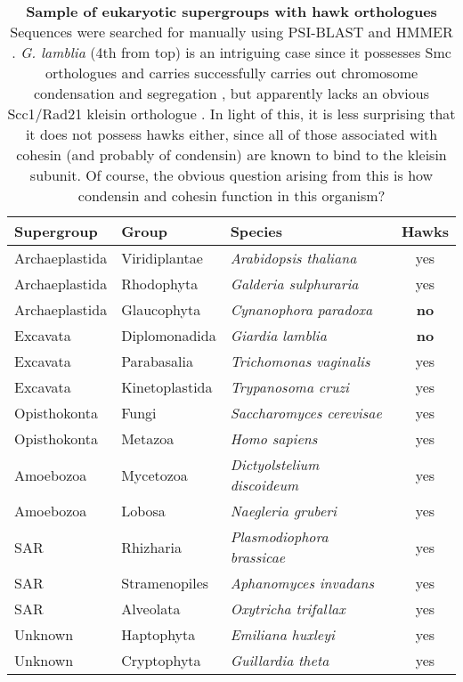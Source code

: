 \documentclass[a4paper,11pt,twoside,openright]{scrbook}
\begin{document}
\begin{table}[h]
    \captionsetup{width=0.85\linewidth}
    \caption[Sample of eukaryotic supergroups with hawk orthologues]{\sffamily \textbf{Sample of eukaryotic supergroups with hawk orthologues} \\ \small Sequences were searched for manually using PSI-BLAST and HMMER \cite{Altschul1997,Finn2011}. \textit{G. lamblia} (4th from top) is an intriguing case since it possesses Smc orthologues and carries successfully carries out chromosome condensation and segregation \cite{Tumova2015}, but apparently lacks an obvious Scc1/Rad21 kleisin orthologue \cite{Eme2011,Tumova2015}. In light of this, it is less surprising that it does not possess hawks either, since all of those associated with cohesin (and probably of condensin) are known to bind to the kleisin subunit. Of course, the obvious question arising from this is how condensin and cohesin function in this organism?}
    \centering
    \onehalfspacing
    \begin{tabular}{l l l c}
    \hline
    Supergroup  & Group   &  Species &   Hawks\\[0.1cm]
    \hline
Archaeplastida &   Viridiplantae  &   \textit{Arabidopsis thaliana}     &  yes\\
Archaeplastida &   Rhodophyta     &   \textit{Galderia sulphuraria}     &  yes\\
Archaeplastida &   Glaucophyta    &   \textit{Cynanophora paradoxa}     &  \textbf{no}\\
Excavata       &   Diplomonadida  &   \textit{Giardia lamblia}          &  \textbf{no}\\
Excavata       &   Parabasalia    &   \textit{Trichomonas vaginalis}    &  yes\\
Excavata       &   Kinetoplastida &   \textit{Trypanosoma cruzi}        &  yes\\
Opisthokonta   &   Fungi          &   \textit{Saccharomyces cerevisae}  &  yes\\
Opisthokonta   &   Metazoa        &   \textit{Homo sapiens}             &  yes\\
Amoebozoa      &   Mycetozoa      &   \textit{Dictyolstelium discoideum}&  yes\\
Amoebozoa      &   Lobosa         &   \textit{Naegleria gruberi}        &  yes\\
SAR            &   Rhizharia      &   \textit{Plasmodiophora brassicae} &  yes\\
SAR            &   Stramenopiles  &   \textit{Aphanomyces invadans}     &  yes\\
SAR            &   Alveolata      &   \textit{Oxytricha trifallax}      &  yes\\
Unknown        &   Haptophyta     &   \textit{Emiliana huxleyi}         &  yes\\
Unknown        &   Cryptophyta    &   \textit{Guillardia theta}         &  yes\\
[0.1cm]
    \hline
    \end{tabular}
    \label{table:eukaryotehawks}
\end{table}
\end{document}
